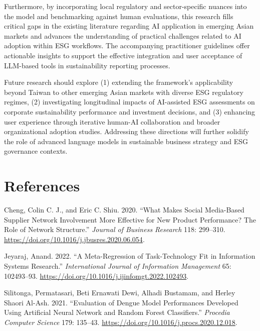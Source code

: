 \documentclass[
  12pt,
]{article}
\newlength{\cslhangindent}
\newenvironment{CSLReferences}[2] %
 {\begin{list}{}{%
  \setlength{\itemindent}{0pt}
  \setlength{\leftmargin}{0pt}
  \setlength{\parsep}{0pt}
  \ifodd #1
   \setlength{\leftmargin}{\cslhangindent}
   \setlength{\itemindent}{-1\cslhangindent}
  \fi
  \setlength{\itemsep}{#2\baselineskip}}}
 {\end{list}}
\begin{document}
Furthermore, by incorporating local regulatory and sector-specific
nuances into the model and benchmarking against human evaluations, this
research fills critical gaps in the existing literature regarding AI
application in emerging Asian markets and advances the understanding of
practical challenges related to AI adoption within ESG workflows. The
accompanying practitioner guidelines offer actionable insights to
support the effective integration and user acceptance of LLM-based tools
in sustainability reporting processes.

Future research should explore (1) extending the framework's
applicability beyond Taiwan to other emerging Asian markets with diverse
ESG regulatory regimes, (2) investigating longitudinal impacts of
AI-assisted ESG assessments on corporate sustainability performance and
investment decisions, and (3) enhancing user experience through
iterative human-AI collaboration and broader organizational adoption
studies. Addressing these directions will further solidify the role of
advanced language models in sustainable business strategy and ESG
governance contexts.

\section*{References}\label{references}

\label{refs}
\begin{CSLReferences}{1}{0}
Cheng, Colin C. J., and Eric C. Shiu. 2020. {``What Makes Social
Media-Based Supplier Network Involvement More Effective for New Product
Performance? The Role of Network Structure.''} \emph{Journal of Business
Research} 118: 299--310.
\url{https://doi.org/10.1016/j.jbusres.2020.06.054}.

Jeyaraj, Anand. 2022. {``A Meta-Regression of Task-Technology Fit in
Information Systems Research.''} \emph{International Journal of
Information Management} 65: 102493--93.
\url{https://doi.org/10.1016/j.ijinfomgt.2022.102493}.

Silitonga, Permatasari, Beti Ernawati Dewi, Alhadi Bustamam, and Herley
Shaori Al-Ash. 2021. {``Evaluation of Dengue Model Performances
Developed Using Artificial Neural Network and Random Forest
Classifiers.''} \emph{Procedia Computer Science} 179: 135--43.
\url{https://doi.org/10.1016/j.procs.2020.12.018}.

\end{CSLReferences}
\end{document}
